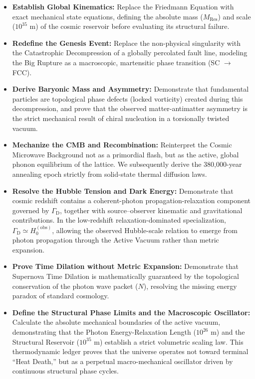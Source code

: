 \begin{itemize}

    \item \textbf{Establish Global Kinematics:} Replace the Friedmann Equation with exact mechanical state equations, defining the absolute mass ($M_{\mathrm{Res}}$) and scale ($10^{35}$ m) of the cosmic reservoir before evaluating its structural failure.

    \item \textbf{Redefine the Genesis Event:} Replace the non-physical singularity with the Catastrophic Decompression of a globally percolated fault line, modeling the Big Rupture as a macroscopic, martensitic phase transition (SC $\to$ FCC).

    \item \textbf{Derive Baryonic Mass and Asymmetry:} Demonstrate that fundamental particles are topological phase defects (locked vorticity) created during this decompression, and prove that the observed matter-antimatter asymmetry is the strict mechanical result of chiral nucleation in a torsionally twisted vacuum.

    \item \textbf{Mechanize the CMB and Recombination:} Reinterpret the Cosmic Microwave Background not as a primordial flash, but as the active, global phonon equilibrium of the lattice. We subsequently derive the 380,000-year annealing epoch strictly from solid-state thermal diffusion laws.

    \item \textbf{Resolve the Hubble Tension and Dark Energy:} Demonstrate that cosmic redshift contains a coherent-photon propagation-relaxation component governed by $\Gamma_{\mathrm D}$, together with source--observer kinematic and gravitational contributions. In the low-redshift relaxation-dominated specialization, $\Gamma_{\mathrm D}\simeq H_0^{(\mathrm{obs})}$, allowing the observed Hubble-scale relation to emerge from photon propagation through the Active Vacuum rather than metric expansion.

    \item \textbf{Prove Time Dilation without Metric Expansion:} Demonstrate that Supernova Time Dilation is mathematically guaranteed by the topological conservation of the photon wave packet ($N$), resolving the missing energy paradox of standard cosmology.

    \item \textbf{Define the Structural Phase Limits and the Macroscopic Oscillator:} Calculate the absolute mechanical boundaries of the active vacuum, demonstrating that the Photon Energy-Relaxation Length ($10^{26}$ m) and the Structural Reservoir ($10^{35}$ m) establish a strict volumetric scaling law. This thermodynamic ledger proves that the universe operates not toward terminal ``Heat Death,'' but as a perpetual macro-mechanical oscillator driven by continuous structural phase cycles.


\end{itemize}
